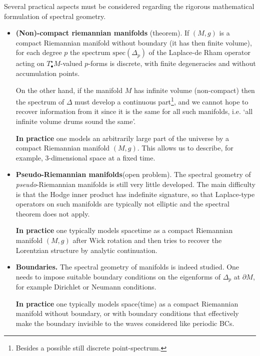 \begin{mytheorem}
%
Several practical aspects must be considered regarding the rigorous mathematical formulation of spectral geometry.
%
\begin{itemize}
\item \textbf{(Non)-compact riemannian manifolds} (theorem).
If \((M,g)\) is a compact Riemannian manifold without boundary (it has then finite volume), for each degree $p$ the spectrum \(\mathrm{spec}(\Delta_p)\) of the Laplace-de Rham operator acting on $T^\star_\bullet M$-valued $p$-forms is discrete, with finite degeneracies and without accumulation points.

On the other hand, if the manifold \(M\) has infinite volume (non-compact) then the spectrum of \(\Delta\) must develop a continuous part\footnote{Besides a possible still discrete point-spectrum.}, and we cannot hope to recover information from it since it is the same for all such manifolds, i.e. `all infinite volume drums sound the same'.

\textbf{In practice} one models an arbitrarily large part of the universe by a compact Riemannian manifold \((M,g)\).  This allows us to describe, for example, 3-dimensional space at a fixed time.
%
\item \textbf{Pseudo-Riemannian manifolds}(open problem).
The spectral geometry of \emph{pseudo}-Riemannian manifolds is still very little developed.
The main difficulty is that the Hodge inner product has indefinite signature, so that Laplace-type operators on such manifolds are typically not elliptic and the spectral theorem does not apply.

\textbf{In practice} one typically models spacetime as a compact Riemannian manifold \((M,g)\) after Wick rotation and then tries to recover the Lorentzian structure by analytic continuation.
%
\item \textbf{Boundaries.} The spectral geometry of manifolds is indeed studied.
One needs to impose suitable boundary conditions on the eigenforms of \(\Delta_p\) at \(\partial M\), for example Dirichlet or Neumann conditions.

\textbf{In practice} one typically models space(time) as a compact Riemannian manifold without boundary, or with boundary conditions that effectively make the boundary invisible to the waves considered like periodic BCs.
%
\end{itemize}

\end{mytheorem}

